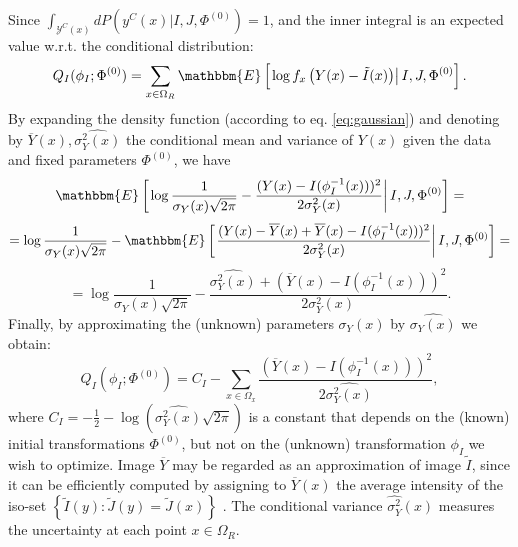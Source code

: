 Since \hbox{$\int_{\mathcal{Y}^{C}(x)}dP(y^{C}(x) | I, J, \Phi^{(0)}) = 1$}, and the inner integral
is an expected value w.r.t. the conditional distribution:
\begin{equation}
     Q_{I}(\phi_{I} ; \Phi^{(0)}) = \sum_{x\in\Omega_{R}} \mathbbm{E} \left[\left.\log f_{x}\left(Y(x) - \tilde{I}(x)\right) \right| I, J, \Phi^{(0)}\right].
\end{equation}
By expanding the density function (according to eq. \eqref{eq:gaussian}) and denoting by $\overline{Y}(x), \widehat{\sigma^{2}_{Y}(x)}$ the conditional mean and variance of $Y(x)$
given the data and fixed parameters $\Phi^{(0)}$, we have
\begin{equation}
    \mathbbm{E} \left[\left.\log \frac{1}{\sigma_{Y}(x)\sqrt{2\pi}} - \frac{(Y(x) - I(\phi^{-1}_{I}(x)))^{2}}{2\sigma^{2}_{Y}(x)}\right|I, J, \Phi^{(0)} \right] =
\end{equation}
\begin{equation}
    = \log \frac{1}{\sigma_{Y}(x)\sqrt{2\pi}} - \mathbbm{E} \left[\left. \frac{(Y(x) - \overline{Y}(x) + \overline{Y}(x) - I(\phi^{-1}_{I}(x)))^{2}}{2\sigma^{2}_{Y}(x)}\right|I, J, \Phi^{(0)} \right]=
\end{equation}
\begin{equation}
    = \log \frac{1}{\sigma_{Y}(x)\sqrt{2\pi}} - \frac{\widehat{\sigma^{2}_{Y}(x)} + (\overline{Y}(x) - I(\phi^{-1}_{I}(x)))^{2}}{2\sigma^{2}_{Y}(x)}.
\end{equation}
Finally, by approximating the (unknown) parameters $\sigma_{Y}(x)$ by $\widehat{\sigma_{Y}(x)}$ we obtain:
\begin{equation}
    Q_{I}(\phi_{I} ; \Phi^{(0)}) = C_{I} - \sum_{x\in\Omega_{x}}\frac{(\overline{Y}(x) - I(\phi^{-1}_{I}(x)))^{2}}{2\widehat{\sigma^{2}_{Y}(x)}},
\end{equation}
where $C_{I} = -\frac{1}{2} - \log\left(\widehat{\sigma^{2}_{Y}(x)}\sqrt{2\pi}\right)$ is a constant that depends on the (known) initial transformations $\Phi^{(0)}$, but not on the (unknown) transformation $\phi_{I}$ we wish to optimize. Image $\overline{Y}$ may be regarded as an approximation of image $\tilde{I}$, since it can be efficiently computed by assigning to $\overline{Y}(x)$ the average intensity of the iso-set $\left\lbrace \tilde{I}(y) : \tilde{J}(y) = \tilde{J}(x)\right\rbrace$ \citep{Roche1998}. The conditional variance $\widehat{\sigma^{2}_{Y}}(x)$ measures the uncertainty at each point $x\in \Omega_{R}$.\\

